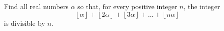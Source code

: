 Find all real numbers $\alpha$ so that, for every positive integer $n$, the integer
\[ \left\lfloor \alpha \right\rfloor + \left\lfloor 2 \alpha \right\rfloor
  + \left\lfloor 3 \alpha \right\rfloor + \dots + \left\lfloor n \alpha \right\rfloor \]
is divisible by $n$.